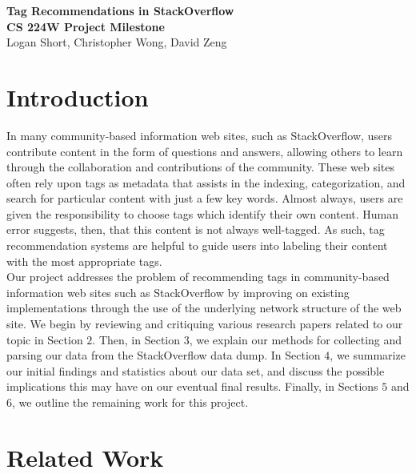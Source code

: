 \documentclass[10pt, final]{article}
\newcommand{\br}[1][.75]{\ \\[#1\baselineskip]}
\begin{document}
\begin{center}
\LARGE{\textbf{Tag Recommendations in StackOverflow}}\\
\Large{\textbf{CS 224W Project Milestone}}\\
\Large{Logan Short, Christopher Wong, David Zeng}
\end{center}

\section{Introduction}

In many community-based information web sites, such as StackOverflow, users contribute content in the form of questions and answers, allowing others to learn through the collaboration and contributions of the community. These web sites often rely upon tags as metadata that assists in the indexing, categorization, and search for particular content with just a few key words. Almost always, users are given the responsibility to choose tags which identify their own content. Human error suggests, then, that this content is not always well-tagged. As such, tag recommendation systems are helpful to guide users into labeling their content with the most appropriate tags.\br
Our project addresses the problem of recommending tags in community-based information web sites such as StackOverflow by improving on existing implementations through the use of the underlying network structure of the web site. We begin by reviewing and critiquing various research papers related to our topic in Section $2$. Then, in Section $3$, we explain our methods for collecting and parsing our data from the StackOverflow data dump. In Section $4$, we summarize our initial findings and statistics about our data set, and discuss the possible implications this may have on our eventual final results. Finally, in Sections $5$ and $6$, we outline the remaining work for this project.


\section{Related Work}
\end{document}
